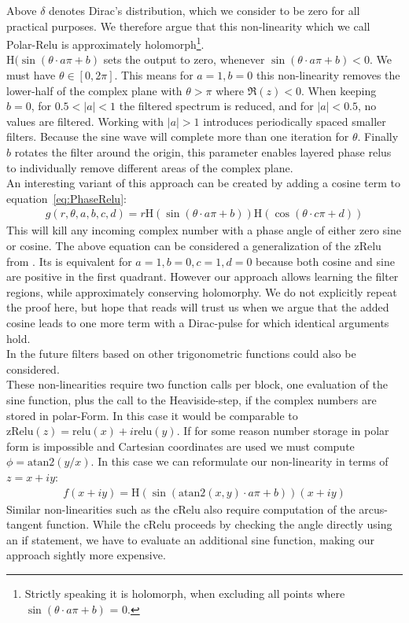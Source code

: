 \documentclass{article}
\begin{document}
Above $\delta$ denotes Dirac's distribution, which we consider to be zero for all practical purposes. 
We therefore argue that this non-linearity which we call Polar-Relu is approximately holomorph\footnote{Strictly speaking it is holomorph, when excluding all points where $\sin (\theta \cdot a\pi + b)$ = 0.}.\\
$\text{H}(\sin(\theta \cdot a \pi + b)$ sets the output to zero, whenever $\sin (\theta \cdot a\pi + b) < 0$. We must have $\theta \in [0, 2\pi]$. This means for $a = 1, b = 0$ this non-linearity removes the lower-half of the complex plane with $\theta > \pi$ where $\Re(z) < 0$. When keeping $b=0$, for $0.5 < |a| < 1$ the filtered spectrum is reduced, and for $|a| < 0.5$, no values are filtered. Working with $|a| > 1$ introduces periodically spaced smaller filters. Because the sine wave will complete more than one iteration for $\theta$. Finally $b$ rotates the filter around the origin, this parameter enables layered phase relus to individually remove different areas of the complex plane. \\
An interesting variant of this approach can be created by adding a cosine term to equation~\ref{eq:PhaseRelu}:
\begin{align}
g(r,\theta,a,b,c,d) = r \text{H}(\sin (\theta \cdot a\pi + b))\text{H}(\cos (\theta \cdot c\pi + d))
\end{align}
This will kill any incoming complex number with a phase angle of either zero sine or cosine. The above equation can be considered a generalization of the zRelu from \cite{Guberman}\cite{Trabelsi}. Its is equivalent for $a=1, b=0, c=1, d=0$ because both cosine and sine are positive in the first quadrant. However our approach allows learning the filter regions, while approximately conserving holomorphy. We do not explicitly repeat the proof here, but hope that reads will trust us when we argue that the added cosine leads to one more term with a Dirac-pulse for which identical arguments hold. \\
In the future filters based on other trigonometric functions could also be considered. \\

These non-linearities require two function calls per block, one evaluation of the sine function, plus the call to the Heaviside-step, if the complex numbers are stored in polar-Form. In this case it would be comparable to $\text{zRelu}(z) = \text{relu}(x) + i\text{relu}(y)$. If for some reason number storage in polar form is impossible and Cartesian coordinates are used we must compute $\phi = \text{atan2}(y/x)$.
In this case we can reformulate our non-linearity in terms of $z = x + iy$:
\begin{align}
f(x + iy) = \text{H}(\sin(\text{atan2}(x,y)\cdot a\pi + b))(x + iy)
\end{align}
Similar non-linearities such as the cRelu also require computation of the arcus-tangent function. While the cRelu proceeds by checking the angle directly using an if statement, we have to evaluate an additional sine function, making our approach sightly more expensive.
\end{document}
